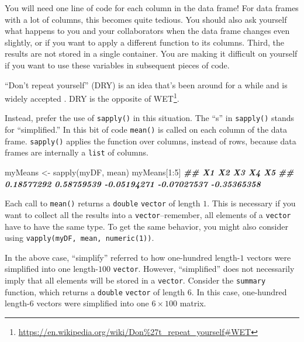 \documentclass[
  12pt,
  krantz2]{krantz}
\makeatletter
\newenvironment{Shaded}{\begin{snugshade}}{\end{snugshade}}
\newcommand{\DecValTok}[1]{\textcolor[rgb]{0.06,0.06,0.06}{#1}}
\newcommand{\DocumentationTok}[1]{\textcolor[rgb]{0.37,0.37,0.37}{\textbf{\textit{#1}}}}
\newcommand{\FunctionTok}[1]{\textcolor[rgb]{0,0,0}{#1}}
\newcommand{\NormalTok}[1]{#1}
\newcommand{\OtherTok}[1]{\textcolor[rgb]{0.37,0.37,0.37}{#1}}
\newcommand{\SpecialCharTok}[1]{\textcolor[rgb]{0,0,0}{#1}}
\renewcommand{\href}[2]{#2\footnote{\url{#1}}}
\newenvironment{kframe}{%
\medskip{}
\setlength{\fboxsep}{.8em}
 \def\at@end@of@kframe{}%
 \ifinner\ifhmode%
  \def\at@end@of@kframe{\end{minipage}}%
  \begin{minipage}{\columnwidth}%
 \fi\fi%
 \def\FrameCommand##1{\hskip\@totalleftmargin \hskip-\fboxsep
 \colorbox{shadecolor}{##1}\hskip-\fboxsep
     \hskip-\linewidth \hskip-\@totalleftmargin \hskip\columnwidth}%
 \MakeFramed {\advance\hsize-\width
   \@totalleftmargin\z@ \linewidth\hsize
   \@setminipage}}%
 {\par\unskip\endMakeFramed%
 \at@end@of@kframe}
\renewenvironment{Shaded}{\begin{kframe}}{\end{kframe}}
\newenvironment{rmd-details}{\begin{lrbox}{\rmdbox}
  \minipage[c]{\dimexpr \textwidth-2\fboxrule-\wd\bulb-\columnsep}
    \vspace*{\columnsep}}%
{\vspace*{\columnsep}\endminipage\end{lrbox}%
  {\par\color{green}\fboxsep=0pt
    \fbox{\usebox\bulb\usebox\rmdbox\hspace{\columnsep}}\par}}
\makeatother
\begin{document}
You will need one line of code for each column in the data frame! For data frames with a lot of columns, this becomes quite tedious. You should also ask yourself what happens to you and your collaborators when the data frame changes even slightly, or if you want to apply a different function to its columns. Third, the results are not stored in a single container. You are making it difficult on yourself if you want to use these variables in subsequent pieces of code.

\begin{rmd-details}
``Don't repeat yourself'' (DRY) is an idea that's been around for a while and is widely accepted \citep{hunt2000pragmatic}. DRY is the opposite of \href{https://en.wikipedia.org/wiki/Don\%27t_repeat_yourself\#WET}{WET}.

\end{rmd-details}

Instead, prefer the use of \texttt{sapply()} in this situation. The ``s'' in \texttt{sapply()} stands for ``simplified.'' In this bit of code \texttt{mean()} is called on each column of the data frame. \texttt{sapply()} applies the function over columns, instead of rows, because data frames are internally a \texttt{list} of columns.

\begin{Shaded}
\begin{Highlighting}[]
\NormalTok{myMeans }\OtherTok{\textless{}{-}} \FunctionTok{sapply}\NormalTok{(myDF, mean)}
\NormalTok{myMeans[}\DecValTok{1}\SpecialCharTok{:}\DecValTok{5}\NormalTok{]}
\DocumentationTok{\#\#          X1          X2          X3          X4          X5 }
\DocumentationTok{\#\#  0.18577292  0.58759539 {-}0.05194271 {-}0.07027537 {-}0.35365358}
\end{Highlighting}
\end{Shaded}

Each call to \texttt{mean()} returns a \texttt{double} \texttt{vector} of length \(1\). This is necessary if you want to collect all the results into a \texttt{vector}--remember, all elements of a \texttt{vector} have to have the same type. To get the same behavior, you might also consider using \texttt{vapply(myDF,\ mean,\ numeric(1))}.

In the above case, ``simplify'' referred to how one-hundred length-\(1\) vectors were simplified into one length-\(100\) \texttt{vector}. However, ``simplified'' does not necessarily imply that all elements will be stored in a \texttt{vector}. Consider the \texttt{summary} function, which returns a \texttt{double} \texttt{vector} of length \(6\). In this case, one-hundred length-\(6\) vectors were simplified into one \(6 \times 100\) matrix.
\end{document}
